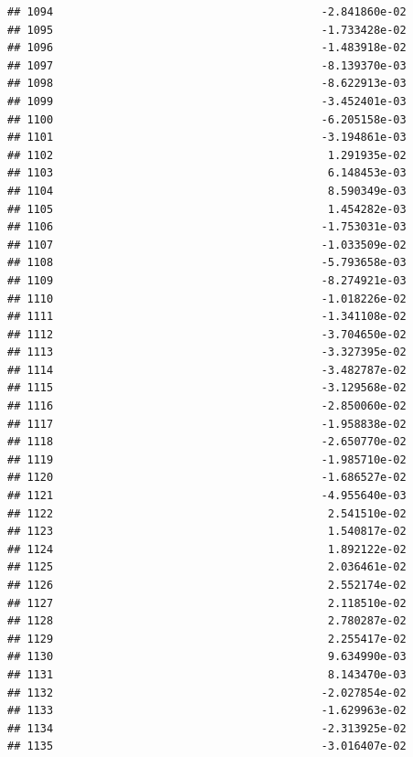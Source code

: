 \documentclass[
]{article}
\begin{document}
\begin{verbatim}
## 1094                                         -2.841860e-02
## 1095                                         -1.733428e-02
## 1096                                         -1.483918e-02
## 1097                                         -8.139370e-03
## 1098                                         -8.622913e-03
## 1099                                         -3.452401e-03
## 1100                                         -6.205158e-03
## 1101                                         -3.194861e-03
## 1102                                          1.291935e-02
## 1103                                          6.148453e-03
## 1104                                          8.590349e-03
## 1105                                          1.454282e-03
## 1106                                         -1.753031e-03
## 1107                                         -1.033509e-02
## 1108                                         -5.793658e-03
## 1109                                         -8.274921e-03
## 1110                                         -1.018226e-02
## 1111                                         -1.341108e-02
## 1112                                         -3.704650e-02
## 1113                                         -3.327395e-02
## 1114                                         -3.482787e-02
## 1115                                         -3.129568e-02
## 1116                                         -2.850060e-02
## 1117                                         -1.958838e-02
## 1118                                         -2.650770e-02
## 1119                                         -1.985710e-02
## 1120                                         -1.686527e-02
## 1121                                         -4.955640e-03
## 1122                                          2.541510e-02
## 1123                                          1.540817e-02
## 1124                                          1.892122e-02
## 1125                                          2.036461e-02
## 1126                                          2.552174e-02
## 1127                                          2.118510e-02
## 1128                                          2.780287e-02
## 1129                                          2.255417e-02
## 1130                                          9.634990e-03
## 1131                                          8.143470e-03
## 1132                                         -2.027854e-02
## 1133                                         -1.629963e-02
## 1134                                         -2.313925e-02
## 1135                                         -3.016407e-02

\end{verbatim}
\end{document}
